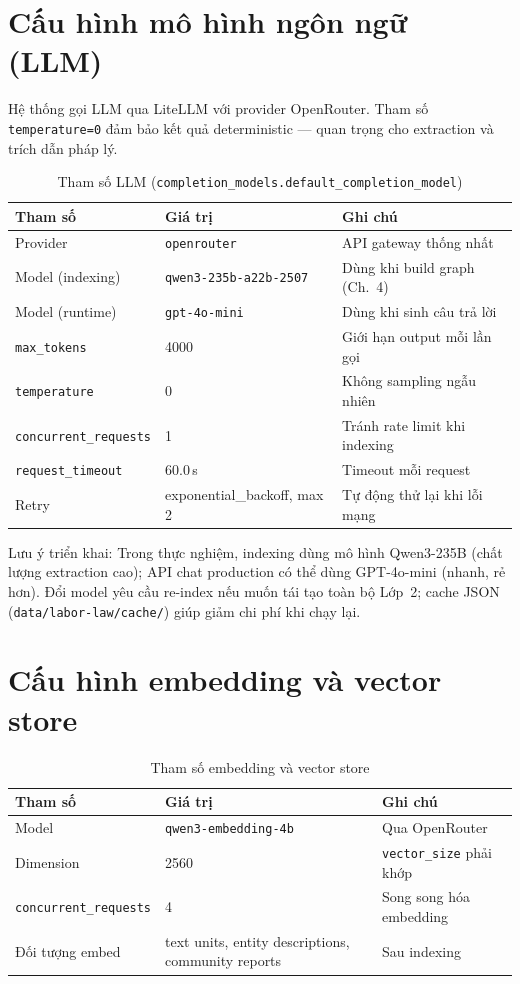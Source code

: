\documentclass[../DoAn.tex]{subfiles}
\begin{document}
\section{Cấu hình mô hình ngôn ngữ (LLM)}
\label{appendix:a-llm}

Hệ thống gọi LLM qua LiteLLM với provider OpenRouter. Tham số \texttt{temperature=0} đảm bảo kết quả deterministic --- quan trọng cho extraction và trích dẫn pháp lý.

\begin{table}[htbp]
\centering
\caption{Tham số LLM (\texttt{completion\_models.default\_completion\_model})}
\label{table:llm-config}
\small
\begin{tabular}{|p{4.8cm}|p{5.2cm}|p{5.2cm}|}
\hline
\textbf{Tham số} & \textbf{Giá trị} & \textbf{Ghi chú} \\
\hline
Provider & \texttt{openrouter} & API gateway thống nhất \\
Model (indexing) & \texttt{qwen3-235b-a22b-2507} & Dùng khi build graph (Ch.~4) \\
Model (runtime) & \texttt{gpt-4o-mini} & Dùng khi sinh câu trả lời \\
\texttt{max\_tokens} & 4000 & Giới hạn output mỗi lần gọi \\
\texttt{temperature} & 0 & Không sampling ngẫu nhiên \\
\texttt{concurrent\_requests} & 1 & Tránh rate limit khi indexing \\
\texttt{request\_timeout} & 60.0\,s & Timeout mỗi request \\
Retry & exponential\_backoff, max 2 & Tự động thử lại khi lỗi mạng \\
\hline
\end{tabular}
\end{table}

Lưu ý triển khai: Trong thực nghiệm, indexing dùng mô hình Qwen3-235B (chất lượng extraction cao); API chat production có thể dùng GPT-4o-mini (nhanh, rẻ hơn). Đổi model yêu cầu re-index nếu muốn tái tạo toàn bộ Lớp~2; cache JSON (\texttt{data/labor-law/cache/}) giúp giảm chi phí khi chạy lại.

\section{Cấu hình embedding và vector store}
\label{appendix:a-embedding}

\begin{table}[htbp]
\centering
\caption{Tham số embedding và vector store}
\label{table:embed-config}
\small
\begin{tabular}{|p{4.8cm}|p{5.2cm}|p{5.8cm}|}
\hline
\textbf{Tham số} & \textbf{Giá trị} & \textbf{Ghi chú} \\
\hline
Model & \texttt{qwen3-embedding-4b} & Qua OpenRouter \\
Dimension & 2560 & \texttt{vector\_size} phải khớp \\
\texttt{concurrent\_requests} & 4 & Song song hóa embedding \\
Đối tượng embed & text units, entity descriptions, community reports & Sau indexing \\
\hline
\end{tabular}
\end{table}
\end{document}

